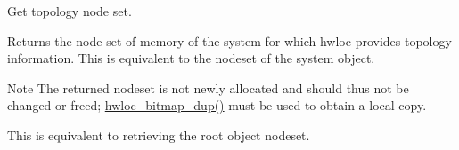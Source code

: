Get topology node set. 

\begin{DoxyReturn}{Returns}
the node set of memory of the system for which hwloc provides topology information. This is equivalent to the nodeset of the system object.
\end{DoxyReturn}
\begin{DoxyNote}{Note}
The returned nodeset is not newly allocated and should thus not be changed or freed; \hyperlink{a00205_gae679434c1a5f41d3560a8a7e2c1b0dee}{hwloc\+\_\+bitmap\+\_\+dup()} must be used to obtain a local copy.

This is equivalent to retrieving the root object nodeset. 
\end{DoxyNote}

